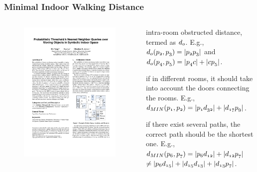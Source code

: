 \begin{frame}
\frametitle{Minimal Indoor Walking Distance}

\begin{columns}[c]
  \begin{figure}[tb]
    \includegraphics[width=\columnwidth]{figures/2-3/2-3-1.pdf}
  \end{figure}

  \begin{itemize}
    \scriptsize{
    \item intra-room obstructed distance, termed as $\mathnormal{d_o}$. E.g., $\mathnormal{d_o(p_2, p_3) = |p_2p_3|}$ and $\mathnormal{d_o(p_4, p_5) = |p_4c|+|cp_5|}$.
    \item if in different rooms, it should take into account the doors connecting the rooms. E.g., $\mathnormal{d_{MIN}(p_1, p_2) = |p_1d_{32}| + |d_{17}p_9|}$.
    \item if there exist several paths, the correct path should be the shortest one. E.g., $\mathnormal{d_{MIN}(p_6, p_7) = |p_6d_{12}| + |d_{12}p_7|}$ $\mathnormal{\neq |p_6d_{15}| + |d_{15}d_{13}| + |d_{13}p_7|}$.
    }
  \end{itemize}

\end{columns}

\end{frame}

